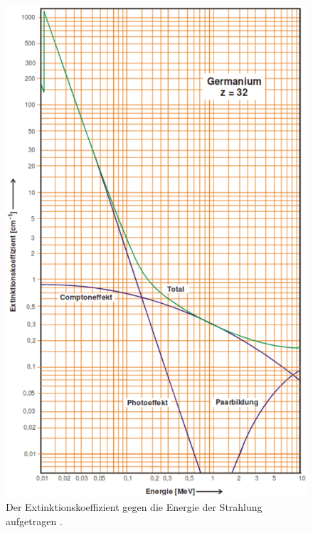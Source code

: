 \begin{figure}
	\includegraphics[width=\linewidth]{Bilder/Extinktionskoeffizient.pdf}
	\caption{Der Extinktionskoeffizient gegen die Energie der Strahlung aufgetragen \cite{V18}.}
	\label{fig:Extink}
\end{figure}



